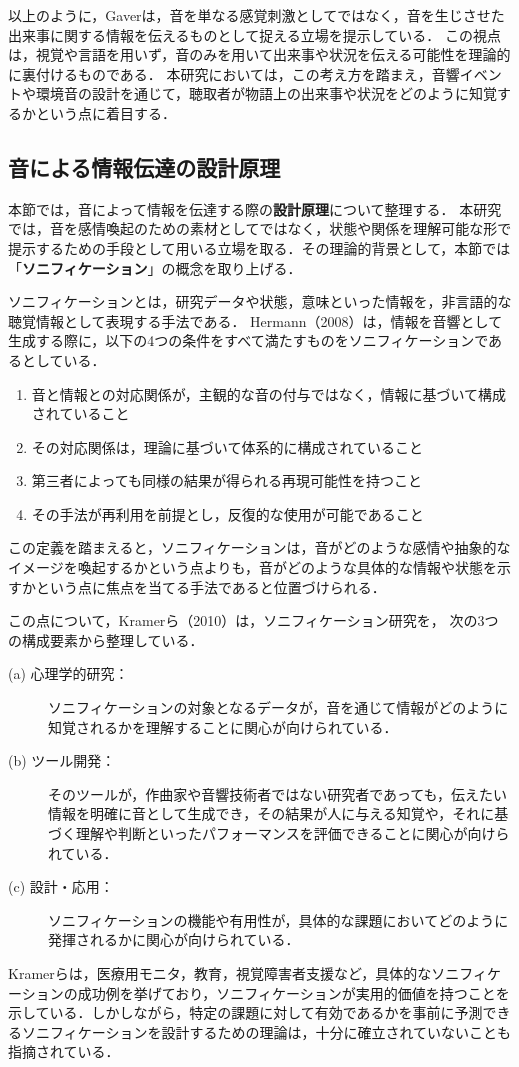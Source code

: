 以上のように，Gaverは，音を単なる感覚刺激としてではなく，音を生じさせた出来事に関する情報を伝えるものとして捉える立場を提示している．
この視点は，視覚や言語を用いず，音のみを用いて出来事や状況を伝える可能性を理論的に裏付けるものである．
本研究においては，この考え方を踏まえ，音響イベントや環境音の設計を通じて，聴取者が物語上の出来事や状況をどのように知覚するかという点に着目する．

\subsection{音による情報伝達の設計原理}
本節では，音によって情報を伝達する際の\textbf{設計原理}について整理する．
本研究では，音を感情喚起のための素材としてではなく，状態や関係を理解可能な形で提示するための手段として用いる立場を取る．その理論的背景として，本節では「\textbf{ソニフィケーション}」の概念を取り上げる．

ソニフィケーションとは，研究データや状態，意味といった情報を，非言語的な聴覚情報として表現する手法である．
Hermann（2008）\cite{hermann_taxonomy_2008}は，情報を音響として生成する際に，以下の4つの条件をすべて満たすものをソニフィケーションであるとしている．
\begin{enumerate}
    \item 音と情報との対応関係が，主観的な音の付与ではなく，情報に基づいて構成されていること
    \item その対応関係は，理論に基づいて体系的に構成されていること
    \item 第三者によっても同様の結果が得られる再現可能性を持つこと
    \item その手法が再利用を前提とし，反復的な使用が可能であること
\end{enumerate}

この定義を踏まえると，ソニフィケーションは，音がどのような感情や抽象的なイメージを喚起するかという点よりも，音がどのような具体的な情報や状態を示すかという点に焦点を当てる手法であると位置づけられる．

この点について，Kramerら（2010）\cite{kramer_sonification_nodate}は，ソニフィケーション研究を，
次の3つの構成要素から整理している．
\begin{description}
    \item[(a) 心理学的研究：]ソニフィケーションの対象となるデータが，音を通じて情報がどのように知覚されるかを理解することに関心が向けられている．
    \item[(b) ツール開発：]そのツールが，作曲家や音響技術者ではない研究者であっても，伝えたい情報を明確に音として生成でき，その結果が人に与える知覚や，それに基づく理解や判断といったパフォーマンスを評価できることに関心が向けられている．
    \item[(c) 設計・応用：]ソニフィケーションの機能や有用性が，具体的な課題においてどのように発揮されるかに関心が向けられている．
\end{description}
Kramerらは，医療用モニタ，教育，視覚障害者支援など，具体的なソニフィケーションの成功例を挙げており，ソニフィケーションが実用的価値を持つことを示している．しかしながら，特定の課題に対して有効であるかを事前に予測できるソニフィケーションを設計するための理論は，十分に確立されていないことも指摘されている．


